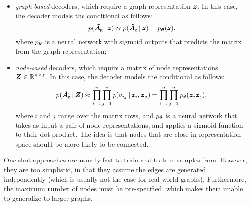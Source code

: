 \begin{itemize}
    \item \emph{graph-based} decoders, which require a graph representation $\Vector{z}$. In this case, the decoder models the conditional as follows:
    $$p(\ProbAdjMatrix{g} \given \Vector{z}) \approx p(\ProbAdjMatrix{g} \given \Vector{z}) = p_{\Param}(\Vector{z}),$$
    where $p_{\boldsymbol{\theta}}$ is a neural network with sigmoid outputs that predicts the matrix from the graph representation;
    \item \emph{node-based} decoders, which require a matrix of node representations $\Matrix{Z} \in \Real^{n \times z}$. In this case, the decoder models the conditional as follows:
    $$p(\ProbAdjMatrix{g} \given \Matrix{z}) \approx \prod_{i=1}^n \prod_{j=1}^n p(a_{ij} \given \Vector{z}_i, \Vector{z}_j) = \prod_{i=1}^n \prod_{j=1}^n p_{\Param}(\Vector{z}_i\Vector{z}_j),$$
    where $i$ and $j$ range over the matrix rows, and $p_{\boldsymbol{\theta}}$ is a neural network that takes as input a pair of node representations, and applies a sigmoid function to their dot product. The idea is that nodes that are close in representation space should be more likely to be connected.
\end{itemize}
One-shot approaches are usually fast to train and to take samples from. However, they are too simplistic, in that they assume the edges are generated independently (which is usually not the case for real-world graphs). Furthermore, the maximum number of nodes must be pre-specified, which makes them unable to generalize to larger graphs.

